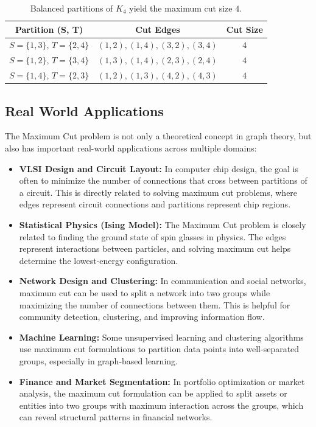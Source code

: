 \documentclass[12pt]{article}
\begin{document}
\begin{table}[h!]
\centering
\begin{tabular}{|c|c|c|}
\hline
\textbf{Partition (S, T)} & \textbf{Cut Edges} & \textbf{Cut Size} \\
\hline
\rowcolor{yellow!20} $S=\{1,3\},\,T=\{2,4\}$ & $(1,2),(1,4),(3,2),(3,4)$ & $4$ \\
$S=\{1,2\},\,T=\{3,4\}$ & $(1,3),(1,4),(2,3),(2,4)$ & $4$ \\
$S=\{1,4\},\,T=\{2,3\}$ & $(1,2),(1,3),(4,2),(4,3)$ & $4$ \\
\hline
\end{tabular}
\caption{Balanced partitions of $K_4$ yield the maximum cut size $4$.}
\end{table}


\subsection{Real World Applications}

The Maximum Cut problem is not only a theoretical concept in graph theory, 
but also has important real-world applications across multiple domains:

\begin{itemize}
    \item \textbf{VLSI Design and Circuit Layout:} In computer chip design, 
    the goal is often to minimize the number of connections that cross between 
    partitions of a circuit. This is directly related to solving maximum cut problems, 
    where edges represent circuit connections and partitions represent chip regions.

    \item \textbf{Statistical Physics (Ising Model):} The Maximum Cut problem is closely 
    related to finding the ground state of spin glasses in physics. The edges represent 
    interactions between particles, and solving maximum cut helps determine 
    the lowest-energy configuration.

    \item \textbf{Network Design and Clustering:} In communication and social networks, 
    maximum cut can be used to split a network into two groups while maximizing the number 
    of connections between them. This is helpful for community detection, clustering, and 
    improving information flow.

    \item \textbf{Machine Learning:} Some unsupervised learning and clustering algorithms 
    use maximum cut formulations to partition data points into well-separated groups, 
    especially in graph-based learning.

    \item \textbf{Finance and Market Segmentation:} In portfolio optimization or market 
    analysis, the maximum cut formulation can be applied to split assets or entities 
    into two groups with maximum interaction across the groups, which can reveal 
    structural patterns in financial networks.
\end{itemize}
\end{document}
